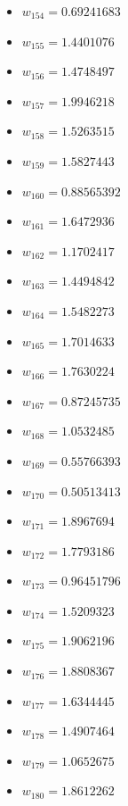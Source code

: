 \documentclass[11pt]{article}
\begin{document}
\begin{itemize}
\item $w_{154} = 0.69241683$
\item $w_{155} = 1.4401076$
\item $w_{156} = 1.4748497$
\item $w_{157} = 1.9946218$
\item $w_{158} = 1.5263515$
\item $w_{159} = 1.5827443$
\item $w_{160} = 0.88565392$
\item $w_{161} = 1.6472936$
\item $w_{162} = 1.1702417$
\item $w_{163} = 1.4494842$
\item $w_{164} = 1.5482273$
\item $w_{165} = 1.7014633$
\item $w_{166} = 1.7630224$
\item $w_{167} = 0.87245735$
\item $w_{168} = 1.0532485$
\item $w_{169} = 0.55766393$
\item $w_{170} = 0.50513413$
\item $w_{171} = 1.8967694$
\item $w_{172} = 1.7793186$
\item $w_{173} = 0.96451796$
\item $w_{174} = 1.5209323$
\item $w_{175} = 1.9062196$
\item $w_{176} = 1.8808367$
\item $w_{177} = 1.6344445$
\item $w_{178} = 1.4907464$
\item $w_{179} = 1.0652675$
\item $w_{180} = 1.8612262$
\end{itemize}
\end{document}
